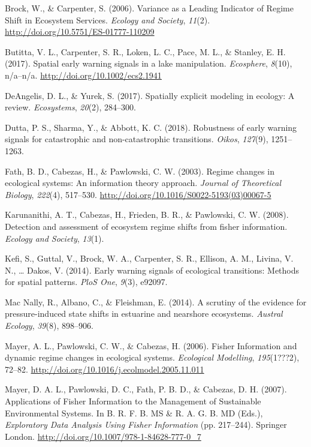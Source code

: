 \documentclass[12pt,twoside,openany]{reedthesis}
\begin{document}
\hypertarget{ref-brock_variance_2006}{}
Brock, W., \& Carpenter, S. (2006). Variance as a Leading Indicator of
Regime Shift in Ecosystem Services. \emph{Ecology and Society},
\emph{11}(2). \url{http://doi.org/10.5751/ES-01777-110209}

\hypertarget{ref-butitta_spatial_2017}{}
Butitta, V. L., Carpenter, S. R., Loken, L. C., Pace, M. L., \& Stanley,
E. H. (2017). Spatial early warning signals in a lake manipulation.
\emph{Ecosphere}, \emph{8}(10), n/a--n/a.
\url{http://doi.org/10.1002/ecs2.1941}

\hypertarget{ref-deangelis2017spatially}{}
DeAngelis, D. L., \& Yurek, S. (2017). Spatially explicit modeling in
ecology: A review. \emph{Ecosystems}, \emph{20}(2), 284--300.

\hypertarget{ref-dutta2018robustness}{}
Dutta, P. S., Sharma, Y., \& Abbott, K. C. (2018). Robustness of early
warning signals for catastrophic and non-catastrophic transitions.
\emph{Oikos}, \emph{127}(9), 1251--1263.

\hypertarget{ref-fath_regime_2003}{}
Fath, B. D., Cabezas, H., \& Pawlowski, C. W. (2003). Regime changes in
ecological systems: An information theory approach. \emph{Journal of
Theoretical Biology}, \emph{222}(4), 517--530.
\url{http://doi.org/10.1016/S0022-5193(03)00067-5}

\hypertarget{ref-karunanithi_detection_2008}{}
Karunanithi, A. T., Cabezas, H., Frieden, B. R., \& Pawlowski, C. W.
(2008). Detection and assessment of ecosystem regime shifts from fisher
information. \emph{Ecology and Society}, \emph{13}(1).

\hypertarget{ref-kefi2014early}{}
Kefi, S., Guttal, V., Brock, W. A., Carpenter, S. R., Ellison, A. M.,
Livina, V. N., \ldots{} Dakos, V. (2014). Early warning signals of
ecological transitions: Methods for spatial patterns. \emph{PloS One},
\emph{9}(3), e92097.

\hypertarget{ref-mac2014scrutiny}{}
Mac Nally, R., Albano, C., \& Fleishman, E. (2014). A scrutiny of the
evidence for pressure-induced state shifts in estuarine and nearshore
ecosystems. \emph{Austral Ecology}, \emph{39}(8), 898--906.

\hypertarget{ref-mayer_fisher_2006}{}
Mayer, A. L., Pawlowski, C. W., \& Cabezas, H. (2006). Fisher
Information and dynamic regime changes in ecological systems.
\emph{Ecological Modelling}, \emph{195}(1???2), 72--82.
\url{http://doi.org/10.1016/j.ecolmodel.2005.11.011}

\hypertarget{ref-mayer_applications_2007}{}
Mayer, D. A. L., Pawlowski, D. C., Fath, P. B. D., \& Cabezas, D. H.
(2007). Applications of Fisher Information to the Management of
Sustainable Environmental Systems. In B. R. F. B. MS \& R. A. G. B. MD
(Eds.), \emph{Exploratory Data Analysis Using Fisher Information} (pp.
217--244). Springer London.
\url{http://doi.org/10.1007/978-1-84628-777-0_7}
\end{document}
